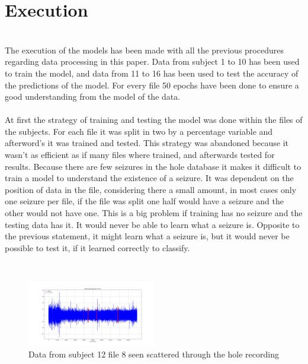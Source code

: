 \section{Execution}
\leavevmode\\
The execution of the models has been made with all the previous procedures regarding data processing in this paper. Data from subject 1 to 10 has been used to train the model, and data from 11 to 16 has been used to test the accuracy of the predictions of the model. For every file 50 epochs have been done to ensure a good understanding from the model of the data.
\\\\
At first the strategy of training and testing the model was done within the files of the subjects. For each file it was split in two by a percentage variable and afterword’s it was trained and tested. This strategy was abandoned because it wasn’t as efficient as if many files where trained, and afterwards tested for results. Because there are few seizures in the hole database it makes it difficult to train a model to understand the existence of a seizure. It was dependent on the position of data in the file, considering there a small amount, in most cases only one seizure per file, if the file was split one half would have a seizure and the other would not have one. This is a big problem if training has no seizure and the testing data has it. It would never be able to learn what a seizure is. Opposite to the previous statement, it might learn what a seizure is, but it would never be possible to test it, if it learned correctly to classify.

\leavevmode\\
\begin{figure}[h!]
  \caption{Data from subject 12 file 8 seen scattered through the hole recording}
  \centering
  \includegraphics[width=0.5\textwidth]{img/12_8-elecFP1-F7.png}
\end{figure}

